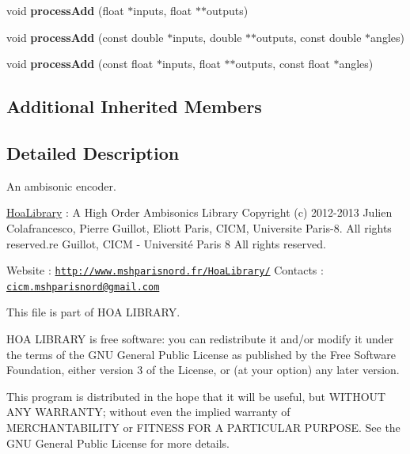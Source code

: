 \begin{DoxyCompactItemize}
\item 
\hypertarget{class_ambisonic_encoder_a11337f3fddf68bc528aea26593267873}{void {\bfseries process\-Add} (float $\ast$inputs, float $\ast$$\ast$outputs)}\label{class_ambisonic_encoder_a11337f3fddf68bc528aea26593267873}

\item 
\hypertarget{class_ambisonic_encoder_aca97de5ae9bbbcc4ad03e77e4ec0115e}{void {\bfseries process\-Add} (const double $\ast$inputs, double $\ast$$\ast$outputs, const double $\ast$angles)}\label{class_ambisonic_encoder_aca97de5ae9bbbcc4ad03e77e4ec0115e}

\item 
\hypertarget{class_ambisonic_encoder_af18b90483e9c7b0a2ef4c8bc1f5f65d6}{void {\bfseries process\-Add} (const float $\ast$inputs, float $\ast$$\ast$outputs, const float $\ast$angles)}\label{class_ambisonic_encoder_af18b90483e9c7b0a2ef4c8bc1f5f65d6}

\end{DoxyCompactItemize}
\subsection*{Additional Inherited Members}


\subsection{Detailed Description}
An ambisonic encoder. 

\hyperlink{interface_hoa_library}{Hoa\-Library} \-: A High Order Ambisonics Library Copyright (c) 2012-\/2013 Julien Colafrancesco, Pierre Guillot, Eliott Paris, C\-I\-C\-M, Universite Paris-\/8. All rights reserved.\-re Guillot, C\-I\-C\-M -\/ Université Paris 8 All rights reserved.

Website \-: \href{http://www.mshparisnord.fr/HoaLibrary/}{\tt http\-://www.\-mshparisnord.\-fr/\-Hoa\-Library/} Contacts \-: \href{mailto:cicm.mshparisnord@gmail.com}{\tt cicm.\-mshparisnord@gmail.\-com}

This file is part of H\-O\-A L\-I\-B\-R\-A\-R\-Y.

H\-O\-A L\-I\-B\-R\-A\-R\-Y is free software\-: you can redistribute it and/or modify it under the terms of the G\-N\-U General Public License as published by the Free Software Foundation, either version 3 of the License, or (at your option) any later version.

This program is distributed in the hope that it will be useful, but W\-I\-T\-H\-O\-U\-T A\-N\-Y W\-A\-R\-R\-A\-N\-T\-Y; without even the implied warranty of M\-E\-R\-C\-H\-A\-N\-T\-A\-B\-I\-L\-I\-T\-Y or F\-I\-T\-N\-E\-S\-S F\-O\-R A P\-A\-R\-T\-I\-C\-U\-L\-A\-R P\-U\-R\-P\-O\-S\-E. See the G\-N\-U General Public License for more details.

